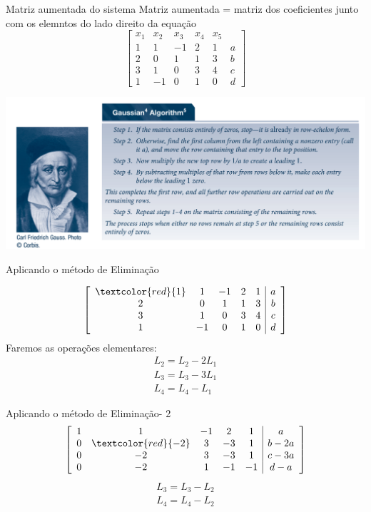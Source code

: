 \documentclass{beamer}
\begin{document}
\begin{frame}{Matriz aumentada do sistema}
  Matriz aumentada = matriz dos coeficientes junto com os elemntos do lado direito da equação
$$
 \left[ \begin{array}{ccccc|c}
    x_1 & x_2 & x_3 & x_4 & x_5 & \\ \hline
    1 & 1 & -1 & 2 & 1 & a \\ 
    2 & 0 & 1 &1 & 3 & b \\
    3 & 1 & 0 & 3 & 4 & c \\
    1 & -1 & 0 & 1 & 0 & d
    \end{array}\right]
$$
  

\end{frame}
\begin{frame}
  \includegraphics[scale=0.4]{gausselim.png}
\end{frame}

\begin{frame}{Aplicando o método de Eliminação}

  $$
  \left[ \begin{array}{ccccc|c}
     \textcolor{red}{1} & 1 & -1 & 2 & 1 & a \\ 
     2 & 0 & 1 &1 & 3 & b \\
     3 & 1 & 0 & 3 & 4 & c \\
     1 & -1 & 0 & 1 & 0 & d
     \end{array}\right]
 $$
Faremos as operações elementares:
\begin{gather*}  
  L_2 = L_2-2L_1 \\
  L_3 = L_3 -3L_1 \\
  L_4 = L_4 - L_1
\end{gather*}
\end{frame}


\begin{frame}{Aplicando o método de Eliminação- 2 }
  $$
  \left[ \begin{array}{ccccc|c}
     1 & 1 & -1 & 2 & 1 & a \\ 
      0 & \textcolor{red}{-2} & 3 &-3 & 1 & b-2a \\
     0 & -2 & 3 & -3 & 1 & c-3a \\
     0 & -2 & 1 & -1 & -1 & d -a
     \end{array}\right]
 $$
 \begin{gather*}  
  L_3 = L_3- L_2 \\
  L_4 = L_4 - L_2
\end{gather*}
\end{frame}
\end{document}

